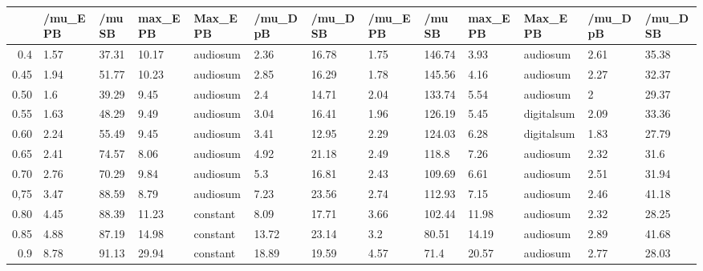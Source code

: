 \begin{table}[ht]
\centering
\begin{tabular}{rllllllllllll}
  \hline
 & /mu\_E PB & /mu SB & max\_E PB & Max\_E PB & /mu\_D pB & /mu\_D SB & /mu\_E PB & /mu SB & max\_E PB & Max\_E PB & /mu\_D pB & /mu\_D SB \\ 
  \hline
0.4 & 1.57 & 37.31 & 10.17 & audiosum & 2.36 & 16.78 & 1.75 & 146.74 & 3.93 & audiosum & 2.61 & 35.38 \\ 
  0.45 & 1.94 & 51.77 & 10.23 & audiosum & 2.85 & 16.29 & 1.78 & 145.56 & 4.16 & audiosum & 2.27 & 32.37 \\ 
  0.50 & 1.6 & 39.29 & 9.45 & audiosum & 2.4 & 14.71 & 2.04 & 133.74 & 5.54 & audiosum & 2 & 29.37 \\ 
  0.55 & 1.63 & 48.29 & 9.49 & audiosum & 3.04 & 16.41 & 1.96 & 126.19 & 5.45 & digitalsum & 2.09 & 33.36 \\ 
  0.60 & 2.24 & 55.49 & 9.45 & audiosum & 3.41 & 12.95 & 2.29 & 124.03 & 6.28 & digitalsum & 1.83 & 27.79 \\ 
  0.65 & 2.41 & 74.57 & 8.06 & audiosum & 4.92 & 21.18 & 2.49 & 118.8 & 7.26 & audiosum & 2.32 & 31.6 \\ 
  0.70 & 2.76 & 70.29 & 9.84 & audiosum & 5.3 & 16.81 & 2.43 & 109.69 & 6.61 & audiosum & 2.51 & 31.94 \\ 
  0,75 & 3.47 & 88.59 & 8.79 & audiosum & 7.23 & 23.56 & 2.74 & 112.93 & 7.15 & audiosum & 2.46 & 41.18 \\ 
  0.80 & 4.45 & 88.39 & 11.23 & constant & 8.09 & 17.71 & 3.66 & 102.44 & 11.98 & audiosum & 2.32 & 28.25 \\ 
  0.85 & 4.88 & 87.19 & 14.98 & constant & 13.72 & 23.14 & 3.2 & 80.51 & 14.19 & audiosum & 2.89 & 41.68 \\ 
  0.9 & 8.78 & 91.13 & 29.94 & constant & 18.89 & 19.59 & 4.57 & 71.4 & 20.57 & audiosum & 2.77 & 28.03 \\ 
   \hline
\end{tabular}
\end{table}
